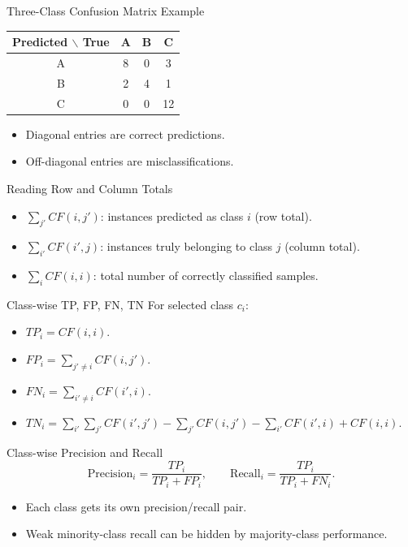 \documentclass[10pt]{beamer}
\begin{document}
\begin{frame}{Three-Class Confusion Matrix Example}
  \justifying
  \begin{table}[ht]
    \centering
    \begin{tabular}{c|ccc}
      \hline
      Predicted $\backslash$ True & A & B & C \\
      \hline
      A & 8 & 0 & 3 \\
      B & 2 & 4 & 1 \\
      C & 0 & 0 & 12 \\
      \hline
    \end{tabular}
  \end{table}
  \begin{itemize}
    \item Diagonal entries are correct predictions.
    \item Off-diagonal entries are misclassifications.
  \end{itemize}
\end{frame}

\begin{frame}{Reading Row and Column Totals}
  \justifying
  \begin{itemize}
    \item $\sum_{j'}CF(i,j')$: instances predicted as class $i$ (row total).
    \item $\sum_{i'}CF(i',j)$: instances truly belonging to class $j$ (column total).
    \item $\sum_i CF(i,i)$: total number of correctly classified samples.
  \end{itemize}
\end{frame}

\begin{frame}{Class-wise TP, FP, FN, TN}
  \justifying
  For selected class $c_i$:
  \begin{itemize}
    \item $TP_i = CF(i,i)$.
    \item $FP_i = \sum_{j'\neq i} CF(i,j')$.
    \item $FN_i = \sum_{i'\neq i} CF(i',i)$.
    \item $TN_i = \sum_{i'}\sum_{j'}CF(i',j') - \sum_{j'}CF(i,j') - \sum_{i'}CF(i',i) + CF(i,i)$.
  \end{itemize}
\end{frame}

\begin{frame}{Class-wise Precision and Recall}
  \justifying
  \[
    \mathrm{Precision}_i = \frac{TP_i}{TP_i+FP_i},
    \qquad
    \mathrm{Recall}_i = \frac{TP_i}{TP_i+FN_i}.
  \]
  \begin{itemize}
    \item Each class gets its own precision/recall pair.
    \item Weak minority-class recall can be hidden by majority-class performance.
  \end{itemize}
\end{frame}
\end{document}
